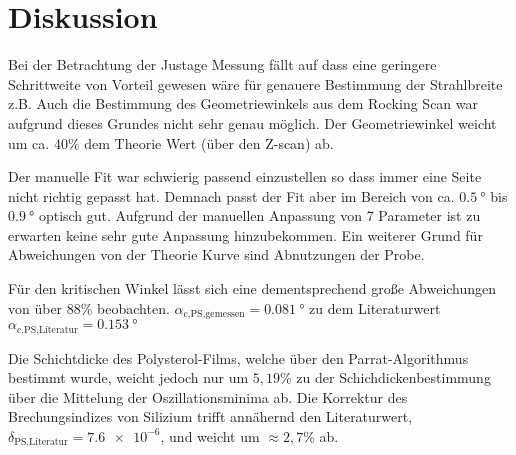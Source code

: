 \section{Diskussion}
\label{sec:Diskussion}


Bei der Betrachtung der Justage Messung fällt auf dass eine geringere Schrittweite
von Vorteil gewesen wäre für genauere Bestimmung der Strahlbreite z.B.
Auch die Bestimmung des Geometriewinkels aus dem Rocking Scan war aufgrund dieses Grundes
nicht sehr genau möglich. 
Der Geometriewinkel weicht um ca. $40 \%$ dem Theorie Wert (über den Z-scan) ab.

Der manuelle Fit war schwierig passend einzustellen so dass immer eine Seite
nicht richtig gepasst hat.
Demnach passt der Fit aber im Bereich von ca. $\SI{0.5}{\degree}$ bis $\SI{0.9}{\degree}$
optisch gut.
Aufgrund der manuellen Anpassung von 7 Parameter ist zu erwarten
keine sehr gute Anpassung hinzubekommen.
Ein weiterer Grund für Abweichungen von der Theorie Kurve sind Abnutzungen der Probe.

Für den kritischen Winkel lässt sich eine 
dementsprechend große Abweichungen von über 
$88 \%$ beobachten.  
$\alpha_\text{c,PS,gemessen} = \SI{0.081}{\degree}$ zu dem Literaturwert 
$\alpha_\text{c,PS,Literatur} = \SI{0.153}{\degree}$\cite{anleitung} 

Die Schichtdicke des Polysterol-Films, welche über den Parrat-Algorithmus bestimmt wurde,
 weicht jedoch nur um $5,19 \%$ zu der Schichdickenbestimmung über die Mittelung der Oszillationsminima ab.
Die Korrektur des Brechungsindizes von Silizium trifft annähernd den Literaturwert, $\delta_\text{PS,Literatur} = \num{7.6e-6}$\cite{anleitung},
 und weicht um $\approx 2,7 \%$ ab.



